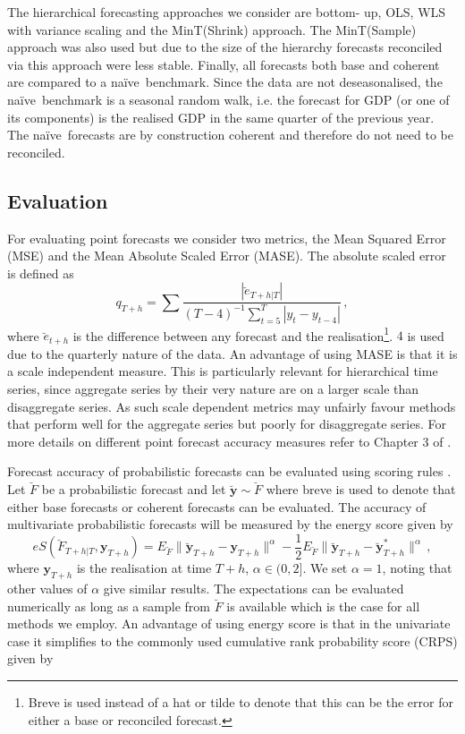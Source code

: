 \documentclass[graybox]{svmult}
\def\naive{na\"{i}ve\ }
\begin{document}
The hierarchical forecasting approaches we consider are bottom- up, OLS, WLS with variance scaling and the MinT(Shrink) approach.  The MinT(Sample) approach was also used but due to the size of the hierarchy forecasts reconciled via this approach were less stable.  Finally, all forecasts both base and coherent are compared to a \naive benchmark.  Since the data are not deseasonalised, the \naive benchmark is a seasonal random walk, i.e. the forecast for GDP (or one of its components) is the realised GDP in the same quarter of the previous year.  The \naive forecasts are by construction coherent and therefore do not need to be reconciled.

\subsection{Evaluation}

For evaluating point forecasts we consider two metrics, the Mean Squared Error (MSE) and the Mean Absolute Scaled Error (MASE).  The absolute scaled error is defined as
\begin{equation*}
q_{T+h} = \sum \frac{|\breve{e}_{T+h|T}|}{(T-4)^{-1}\sum_{t=5}^{T}|y_t - y_{t-4}|}\,,
\end{equation*}
where $\breve{e}_{t+h}$ is the difference between any forecast and the realisation\footnote{Breve is used instead of a hat or tilde to denote that this can be the error for either a base or reconciled forecast.}. $4$ is used due to the quarterly nature of the data.  An advantage of using MASE is that it is a scale independent measure. This is particularly relevant for hierarchical time series, since aggregate series by their very nature are on a larger scale than disaggregate series.  As such scale dependent metrics may unfairly favour methods that perform well for the aggregate series but poorly for disaggregate series.  For more details on different point forecast accuracy measures refer to Chapter 3 of \citet{HynAth2018}.

Forecast accuracy of probabilistic forecasts can be evaluated using scoring rules \citep{Gneiting2014}.  Let $\breve{F}$ be a probabilistic forecast and let $\breve{\bm{y}}\sim \breve{F}$  where breve is used to denote that either base forecasts or coherent forecasts can be evaluated.  The accuracy of multivariate probabilistic forecasts will be measured by the energy score given by
\begin{equation*}
eS(\breve{F}_{T+h|T},\bm{y}_{T+h}) =
E_{\breve{F}}\|\breve{\bm{y}}_{T+h}-\bm{y}_{T+h}\|^\alpha
-\frac{1}{2}E_{\breve{F}}\|\breve{\bm{y}}_{T+h}-\breve{\bm{y}}^*_{T+h}\|^\alpha\,,
\end{equation*} where $\bm{y}_{T+h}$ is the realisation at time $T+h$, $\alpha\in (0,2]$. We set $\alpha=1$, noting that other values of $\alpha$ give similar results.  The expectations can be evaluated numerically as long as a sample from $\breve{F}$ is available which is the case for all methods we employ.  An advantage of using energy score is that in the univariate case it simplifies to the commonly used cumulative rank probability score (CRPS) given by
\end{document}
